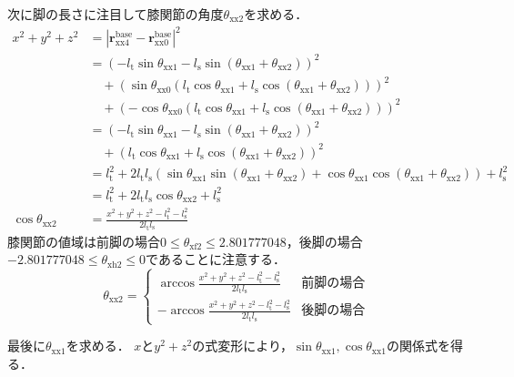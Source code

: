 \documentclass[a4paper]{jlreq}
\begin{document}
  次に脚の長さに注目して膝関節の角度$\theta_\mathrm{xx2}$を求める．
  \begin{align*}
    x^2 + y^2 + z^2 &= \left|\boldsymbol{r}_\mathrm{xx4}^\mathrm{base} - \boldsymbol{r}^\mathrm{base}_\mathrm{xx0}\right|^2 \\
    &= \left(-l_\mathrm{t}\sin{\theta_\mathrm{xx1}} - l_\mathrm{s}\sin{\left(\theta_\mathrm{xx1}+\theta_\mathrm{xx2}\right)}\right)^2 \\
    &\quad + \left(\sin\theta_\mathrm{xx0}\left(l_\mathrm{t}\cos{\theta_\mathrm{xx1}} + l_\mathrm{s}\cos{\left(\theta_\mathrm{xx1}+\theta_\mathrm{xx2}\right)}\right)\right)^2 \\
    &\quad + \left(-\cos\theta_\mathrm{xx0}\left(l_\mathrm{t}\cos{\theta_\mathrm{xx1}} + l_\mathrm{s}\cos{\left(\theta_\mathrm{xx1}+\theta_\mathrm{xx2}\right)}\right)\right)^2 \\
    &= \left(-l_\mathrm{t}\sin{\theta_\mathrm{xx1}} - l_\mathrm{s}\sin{\left(\theta_\mathrm{xx1}+\theta_\mathrm{xx2}\right)}\right)^2 \\
    &\quad + \left(l_\mathrm{t}\cos{\theta_\mathrm{xx1}} + l_\mathrm{s}\cos{\left(\theta_\mathrm{xx1}+\theta_\mathrm{xx2}\right)}\right)^2 \\
    &= l_\mathrm{t}^2 + 2l_\mathrm{t}l_\mathrm{s}\left(
      \sin{\theta_\mathrm{xx1}}\sin{\left(\theta_\mathrm{xx1}+\theta_\mathrm{xx2}\right)}
      + \cos{\theta_\mathrm{xx1}}\cos{\left(\theta_\mathrm{xx1}+\theta_\mathrm{xx2}\right)}\right)
     + l_\mathrm{s}^2 \\
    &= l_\mathrm{t}^2 + 2l_\mathrm{t}l_\mathrm{s}\cos{\theta_\mathrm{xx2}} + l_\mathrm{s}^2 \\
    \cos{\theta_\mathrm{xx2}} &= \frac{x^2 + y^2 + z^2 - l_\mathrm{t}^2 - l_\mathrm{s}^2}{2l_\mathrm{t}l_\mathrm{s}}
  \end{align*}
  膝関節の値域は前脚の場合$0 \leq \theta_\mathrm{xf2} \leq 2.801777048$，後脚の場合$-2.801777048 \leq \theta_\mathrm{xh2} \leq 0$であることに注意する．
  \[
    \theta_\mathrm{xx2} = \begin{cases}
      \arccos{\frac{x^2 + y^2 + z^2 - l_\mathrm{t}^2 - l_\mathrm{s}^2}{2l_\mathrm{t}l_\mathrm{s}}} & \text{前脚の場合} \\
      -\arccos{\frac{x^2 + y^2 + z^2 - l_\mathrm{t}^2 - l_\mathrm{s}^2}{2l_\mathrm{t}l_\mathrm{s}}} & \text{後脚の場合}
    \end{cases}
  \]

  最後に$\theta_\mathrm{xx1}$を求める．
  $x$と$y^2+z^2$の式変形により，$\sin\theta_\mathrm{xx1}, \cos\theta_\mathrm{xx1}$の関係式を得る．
\end{document}
